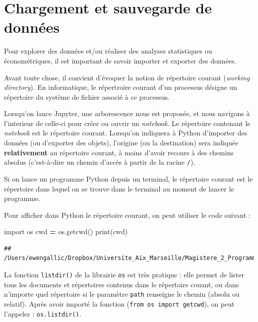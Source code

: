 \documentclass[12pt,]{book}
\newenvironment{Shaded}{\begin{snugshade}}{\end{snugshade}}
\newcommand{\ImportTok}[1]{#1}
\newcommand{\OperatorTok}[1]{\textcolor[rgb]{0.81,0.36,0.00}{\textbf{#1}}}
\newcommand{\BuiltInTok}[1]{#1}
\newcommand{\NormalTok}[1]{#1}
\numberwithin{equation}{section}
\numberwithin{countremarque}{section}
\let\BeginKnitrBlock\begin \let\EndKnitrBlock\end
\begin{document}
\chapter{Chargement et sauvegarde de
données}\label{chargement-et-sauvegarde-de-donnees}

Pour explorer des données et/ou réaliser des analyses statistiques ou
économétriques, il est important de savoir importer et exporter des
données.

Avant toute chose, il convient d'évoquer la notion de répertoire courant
(\emph{working directory}). En informatique, le répertroire courant d'un
processus désigne un répertoire du système de fichier associé à ce
processus.

Lorsqu'on lance Jupyter, une arborescence nous est proposée, et nous
navigons à l'interieur de celle-ci pour créer ou ouvrir un
\emph{notebook}. Le répertoire contenant le \emph{notebook} est le
répertoire courant. Lorsqu'on indiquera à Python d'importer des données
(ou d'exporter des objets), l'origine (ou la destination) sera indiquée
\textbf{relativement} au répertoire courant, à moins d'avoir recours à
des chemins absolus (c'est-à-dire un chemin d'accès à partir de la
racine \texttt{/}).

Si on lance un programme Python depuis un terminal, le répertoire
courant est le répertoire dans lequel on se trouve dans le terminal au
moment de lancer le programme.

Pour afficher dans Python le répertoire courant, on peut utiliser le
code suivant :

\begin{Shaded}
\begin{Highlighting}[]
\ImportTok{import}\NormalTok{ os}
\NormalTok{cwd }\OperatorTok{=}\NormalTok{ os.getcwd()}
\BuiltInTok{print}\NormalTok{(cwd)}
\end{Highlighting}
\end{Shaded}

\begin{lstlisting}
## /Users/ewengallic/Dropbox/Universite_Aix_Marseille/Magistere_2_Programming_for_big_data/Cours/chapters/python/Python_pour_economistes
\end{lstlisting}

\BeginKnitrBlock{remarque}
La fonction \texttt{listdir()} de la librairie \texttt{os} est très
pratique : elle permet de lister tous les documents et répertoires
contenus dans le répertoire couant, ou dans n'importe quel répertoire si
le paramètre \texttt{path} renseigne le chemin (absolu ou relatif).
Après avoir importé la fonction (\texttt{from\ os\ import\ getcwd}), on
peut l'appeler : \texttt{os.listdir()}.
\EndKnitrBlock{remarque}
\end{document}

